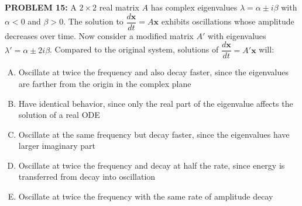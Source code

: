 \documentclass[12pt]{amsart}
\begin{document}
%

\newpage

{\bf PROBLEM 15:}
%
A $2 \times 2$ real matrix $A$ has complex eigenvalues $\lambda = \alpha \pm i\beta$ 
with $\alpha < 0$ and $\beta > 0$. The solution to $\dfrac{d\mathbf{x}}{dt} = A\mathbf{x}$ 
exhibits oscillations whose amplitude decreases over time.
%
Now consider a modified matrix $A'$ with eigenvalues $\lambda' = \alpha \pm 2i\beta$.
%
Compared to the original system, solutions of $\dfrac{d\mathbf{x}}{dt} = A'\mathbf{x}$ will:

\begin{enumerate}[(A)]
\item Oscillate at twice the frequency and also decay faster, since the eigenvalues are farther from the origin in the complex plane
\item Have identical behavior, since only the real part of the eigenvalue affects the solution of a real ODE
\item Oscillate at the same frequency but decay faster, since the eigenvalues have larger imaginary part
\item Oscillate at twice the frequency and decay at half the rate, since energy is transferred from decay into oscillation
\item Oscillate at twice the frequency with the same rate of amplitude decay
\end{enumerate}
\end{document}
